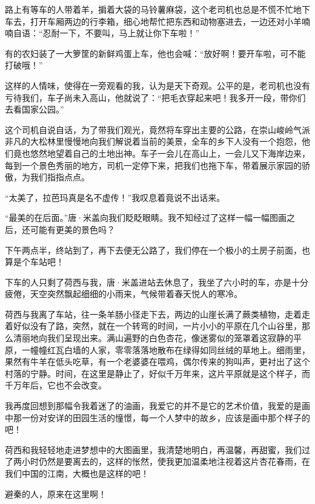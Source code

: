 \par 路上有等车的人带着羊，掮着大袋的马铃薯麻袋，这个老司机也总是不慌不忙地下车去，打开车厢两边的行李箱，细心地帮忙把东西和动物塞进去，一边还对小羊喃喃自语：“忍耐一下，不要叫，马上就让你下车啦！”
\par 有的农妇装了一大箩筐的新鲜鸡蛋上车，他也会喊：“放好啊！要开车啦，可不能打破哦！”
\par 这样的人情味，使得在一旁观看的我，认为是天下奇观。公平的是，老司机也没有亏待我们，车子尚未入高山，他就说了：“把毛衣穿起来吧！我多开一段，带你们去看国家公园。”
\par 这个司机自说自话，为了带我们观光，竟然将车穿出主要的公路，在崇山峻岭气派非凡的大松林里慢慢地向我们解说着当前的美景，全车的乡下人没有一个抱怨，他们竟也悠然地望着自己的土地出神。车子一会儿在高山上，一会儿又下海岸边来，每到一个景色秀丽的地方，司机一定停下来，把我们也拖下车，带着展示家园的骄傲，为我们指指点点。
\par “太美了，拉芭玛真是名不虚传！”我叹息着竟说不出话来。
\par “最美的在后面。”唐·米盖向我们眨眨眼睛。我不知经过了这样一幅一幅图画之后，还可能有更美的景色吗？
\par 下午两点半，终站到了，再下去便无公路了，我们停在一个极小的土房子前面，也算是个车站吧！
\par 下车的人只剩了荷西与我，唐·米盖进站去休息了，我坐了六小时的车，亦是十分疲倦，天空突然飘起细细的小雨来，气候带着春天悦人的寒冷。
\par 荷西与我离了车站，往一条羊肠小径走下去，两边的山崖长满了蕨类植物，走着走着好似没有了路，突然，就在一个转弯的时间，一片小小的平原在几个山谷里，那么清丽地向我们呈现出来。满山遍野的白色杏花，像迷雾似的笼罩着这寂静的平原，一幢幢红瓦白墙的人家，零零落落地散布在绿得如同丝绒的草地上。细雨里，果然有牛羊在低头吃草，有一个老婆婆在喂鸡，偶尔传来的狗叫声，更衬出了这个村落的宁静。时间，在这里是静止了，好似千万年来，这片平原就是这个样子，而千万年后，它也不会改变。
\par 我再度回想到那幅令我着迷了的油画，我爱它的并不是它的艺术价值，我爱的是画中那一份对安详的田园生活的憧憬，每一个人梦中的故乡，应该是画中那个样子的吧！
\par 荷西和我轻轻地走进梦想中的大图画里，我清楚地明白，再温馨，再甜蜜，我们过了两小时仍然是要离去的，这样的怅然，使我更加温柔地注视着这片杏花春雨，在我们中国的江南，大概也是这样的吧！
\par 避秦的人，原来在这里啊！
